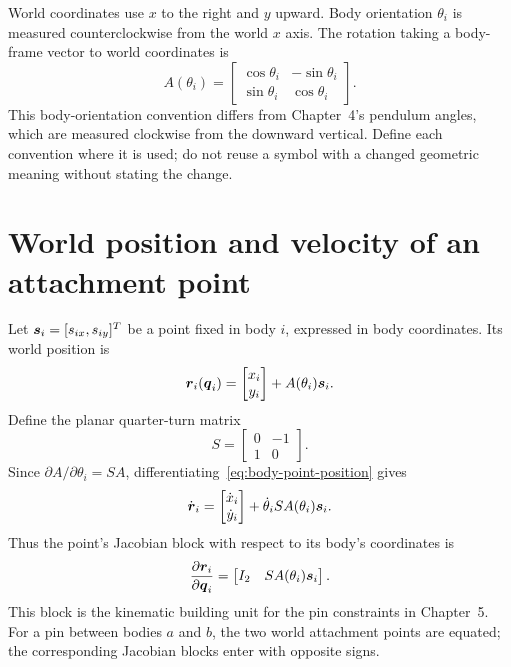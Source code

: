 \documentclass[../main.tex]{subfiles}
\begin{document}
World coordinates use $x$ to the right and $y$ upward. Body orientation $\theta_i$ is measured counterclockwise from the world $x$ axis. The rotation taking a body-frame vector to world coordinates is
\begin{equation}
	A(\theta_i)=
	\begin{bmatrix}
		\cos\theta_i & -\sin\theta_i\\
		\sin\theta_i & \cos\theta_i
	\end{bmatrix}.
	\label{eq:planar-rotation}
\end{equation}
This body-orientation convention differs from Chapter~4's pendulum angles, which are measured clockwise from the downward vertical. Define each convention where it is used; do not reuse a symbol with a changed geometric meaning without stating the change.

\section{World position and velocity of an attachment point}

Let $\boldsymbol{s}_i=[s_{ix},s_{iy}]^T$ be a point fixed in body $i$, expressed in body coordinates. Its world position is
\begin{equation}
	\boldsymbol{r}_i(\boldsymbol{q}_i)
	= \begin{bmatrix}x_i\\y_i\end{bmatrix}+A(\theta_i)\boldsymbol{s}_i.
	\label{eq:body-point-position}
\end{equation}
Define the planar quarter-turn matrix
\begin{equation}
	S=\begin{bmatrix}0&-1\\1&0\end{bmatrix}.
	\label{eq:planar-quarter-turn}
\end{equation}
Since $\partial A/\partial\theta_i=SA$, differentiating~\eqref{eq:body-point-position} gives
\begin{equation}
	\dot{\boldsymbol{r}}_i
	=\begin{bmatrix}\dot x_i\\\dot y_i\end{bmatrix}
	 +\dot\theta_i S A(\theta_i)\boldsymbol{s}_i.
	\label{eq:body-point-velocity}
\end{equation}
Thus the point's Jacobian block with respect to its body's coordinates is
\begin{equation}
	\frac{\partial\boldsymbol{r}_i}{\partial\boldsymbol{q}_i}
	=\begin{bmatrix}I_2 & SA(\theta_i)\boldsymbol{s}_i\end{bmatrix}.
	\label{eq:body-point-jacobian}
\end{equation}
This block is the kinematic building unit for the pin constraints in Chapter~5. For a pin between bodies $a$ and $b$, the two world attachment points are equated; the corresponding Jacobian blocks enter with opposite signs.
\end{document}
